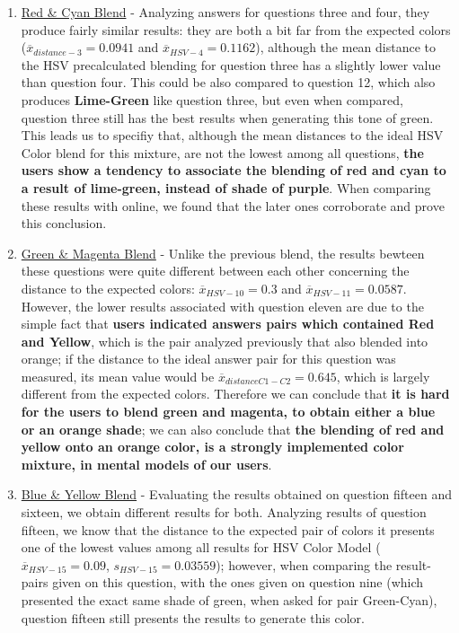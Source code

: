 \begin{enumerate}
  \item \ul{Red \& Cyan Blend} - Analyzing answers for questions three and four, they produce fairly similar results: they are both a bit far from the expected colors ($\overline{x}_{distance-3} = 0.0941$ and
  $\overline{x}_{HSV-4} = 0.1162$), although the mean distance to the HSV precalculated blending for question three has a slightly lower value than question four. This could be also compared to question 12, which also
  produces \textbf{Lime-Green} like question three, but even when compared, question three still has the best results when generating this tone of green. This leads us to specifiy that, although the mean distances to the
  ideal HSV Color blend for this mixture, are not the lowest among all questions, \textbf{the users show a tendency to associate the blending of red and cyan to a result of lime-green, instead of shade of purple}. When comparing
  these results with online, we found that the later ones corroborate and prove this conclusion.
  \item \ul{Green \& Magenta Blend} - Unlike the previous blend, the results bewteen these questions were quite different between each other concerning the distance to the expected colors: $\overline{x}_{HSV-10} = 0.3$
  and $\overline{x}_{HSV-11} = 0.0587$. However, the lower results associated with question eleven are due to the simple fact that \textbf{users indicated answers pairs which contained Red and Yellow}, which is the pair
  analyzed previously that also blended into orange; if the distance to the ideal answer pair for this question was measured, its mean value would be $\overline{x}_{distanceC1-C2} = 0.645$, which is largely different from the
  expected colors. Therefore we can conclude that \textbf{it is hard for the users to blend green and magenta, to obtain either a blue or an orange shade}; we can also conclude that \textbf{the blending of red and yellow
  onto an orange color, is a strongly implemented color mixture, in mental models of our users}.
  \item \ul{Blue \& Yellow Blend} - Evaluating the results obtained on question fifteen and sixteen, we obtain different results for both. Analyzing results of question fifteen, we know that the distance to the expected
  pair of colors it presents one of the lowest values among all results for HSV Color Model ($\overline{x}_{HSV-15} = 0.09$, $s_{HSV-15} = 0.03559$); however, when comparing the result-pairs given on this question, with
  the ones given on question nine (which presented the exact same shade of green, when asked for pair Green-Cyan), question fifteen still presents the results to generate this color.

\end{enumerate}
